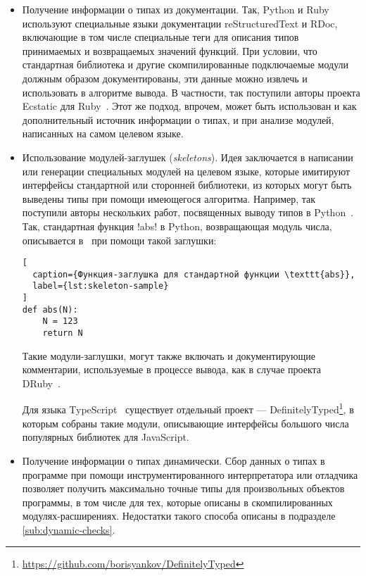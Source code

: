 \begin{itemize}
    \item Получение информации о типах из документации.  Так, Python и Ruby
        используют специальные языки документации reStructuredText и RDoc,
        включающие в том числе специальные теги для описания типов принимаемых и
        возвращаемых значений функций. При условии, что стандартная библиотека и
        другие скомпилированные подключаемые модули должным образом
        документированы, эти данные можно извлечь и использовать в алгоритме
        вывода.  В частности, так поступили авторы проекта Ecstatic для
        Ruby~\cite{Madsen2007}.  Этот же подход, впрочем, может быть использован
        и как дополнительный источник информации о типах, и при анализе модулей,
        написанных на самом целевом языке.

    \item Использование модулей-заглушек (\emph{skeletons}). Идея заключается в
        написании или генерации специальных модулей на целевом языке, которые
        имитируют интерфейсы стандартной или сторонней библиотеки,
        из которых могут быть выведены типы при помощи имеющегося алгоритма.
        Например, так поступили авторы нескольких работ, посвященных
        выводу типов в Python~\cite{Aycock2000,Salib2004}.  Так,
        стандартная функция !abs! в Python, возвращающая модуль числа,
        описывается в~\cite{Aycock2000} при помощи такой заглушки:

\begin{lstlisting}[
  caption={Функция-заглушка для стандартной функции \texttt{abs}},
  label={lst:skeleton-sample}
]
def abs(N):
    N = 123
    return N
        \end{lstlisting}

        Такие модули-заглушки, могут также включать и документирующие
        комментарии, используемые в процессе вывода, как в случае
        проекта DRuby~\cite{Furr2009}.
        
        Для языка TypeScript~\cite{TypeScript} существует отдельный проект ---
        DefinitelyTyped\footnote{\url{https://github.com/borisyankov/DefinitelyTyped}},
        в которым собраны такие модули, описывающие интерфейсы большого числа
        популярных библиотек для JavaScript.

      \item Получение информации о типах динамически. Сбор данных о типах в
          программе при помощи инструментированного интерпретатора или отладчика
          позволяет получить максимально точные типы для произвольных объектов
          программы, в том числе для тех, которые описаны в скомпилированных
          модулях-расширениях. Недостатки такого способа описаны в подразделе
          \ref{sub:dynamic-checks}.

\end{itemize}

